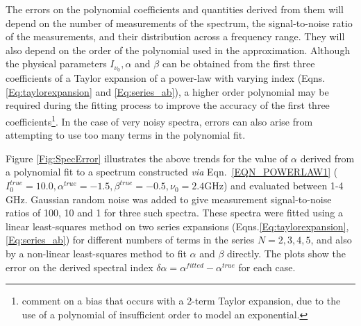 \documentclass[structabstract]{stylefiles/aa}
\newcommand{\nuno}{{\left(\frac{\nu}{\nu_0}\right)}}
\newcommand{\dnuno}{{\left(\frac{\nu-\nu_0}{\nu_0}\right)}}
\begin{document}
The errors on the polynomial coefficients and quantities derived from them
will depend on the number of measurements of the spectrum, 
the signal-to-noise ratio
of the measurements, and their distribution across a frequency range.
They will also depend on the order of the polynomial used in the approximation.
Although the physical parameters $I_{\nu_0},\alpha$ and $\beta$ can be obtained from 
the first three coefficients of a Taylor expansion of a power-law with varying index
(Eqns.\ref{Eq:taylorexpansion} and \ref{Eq:series_ab}),
a higher order polynomial may be required during the fitting process to 
improve the accuracy of the first three coefficients\footnote
{\citet{MFCLEAN_CCW} comment on a bias that occurs with a 2-term Taylor expansion, due to the 
use of a polynomial of insufficient order to model an exponential.}.
%
In the case of very noisy spectra, 
errors can also arise from attempting to use too many terms in the polynomial fit.

\enlargethispage{\baselineskip}
Figure \ref{Fig:SpecError} illustrates the above trends for the value of $\alpha$
derived from a polynomial fit to a spectrum
constructed {\it via} Eqn.~\ref{EQN_POWERLAW1} 
($I^{true}_0=10.0,\alpha^{true}=-1.5,\beta^{true}=-0.5,\nu_0 = 2.4$GHz)
and evaluated between 1-4 GHz. 
Gaussian random noise was added to give measurement signal-to-noise
ratios of 100, 10 and 1 for three such spectra. 
These spectra were fitted using a linear least-squares method
on two series expansions (Eqns.\ref{Eq:taylorexpansion},\ref{Eq:series_ab})
for different numbers of
terms in the series $N=2,3,4,5$, and also by a non-linear least-squares method to
fit $\alpha$ and $\beta$ directly.
The plots show the error on the derived spectral index
$\delta\alpha=\alpha^{fitted}-\alpha^{true}$ for each case.
%
\end{document}
